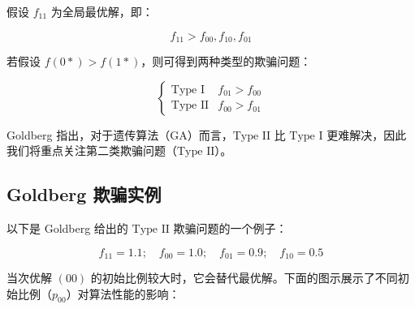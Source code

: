 \documentclass[journal=gmj]{report}%
\theoremstyle{definition}
\numberwithin{equation}{section}
\begin{document}
假设 $f_{11}$ 为全局最优解，即：

$$
f_{11} > f_{00}, f_{10}, f_{01}
$$

若假设 $f(0*) > f(1*)$，则可得到两种类型的欺骗问题：

$$
\begin{cases}
  \text{Type I} & f_{01} > f_{00}\\
  \text{Type II} & f_{00} > f_{01}
\end{cases}
$$

Goldberg 指出，对于遗传算法（GA）而言，$\text{Type II}$ 比 $\text{Type I}$ 更难解决，因此我们将重点关注第二类欺骗问题（$\text{Type II}$）。

\subsection{Goldberg 欺骗实例}

以下是 Goldberg 给出的 $\text{Type II}$ 欺骗问题的一个例子：

$$
f_{11} = 1.1 ;\quad f_{00} = 1.0 ;\quad f_{01} = 0.9 ;\quad f_{10} = 0.5
$$

当次优解 $(00)$ 的初始比例较大时，它会替代最优解。下面的图示展示了不同初始比例（$p_{00}$）对算法性能的影响：
\end{document}
